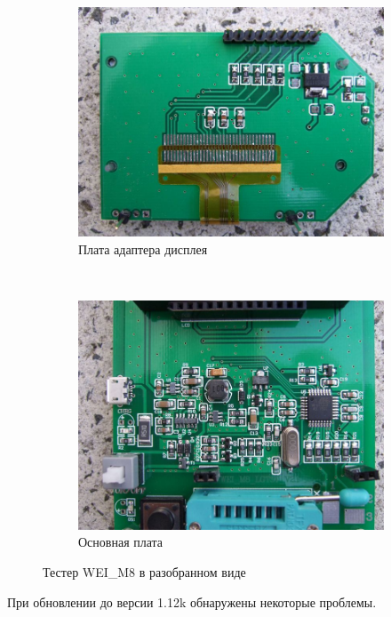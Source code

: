 \begin{figure}[H]
  \begin{subfigure}[b]{.5\textwidth}
    \centering
    \includegraphics[width=1.\textwidth]{../PNG/WEI_M8_D.JPG}
    \caption{Плата адаптера дисплея}
  \end{subfigure}
  ~
  \begin{subfigure}[b]{.5\textwidth}
    \centering
    \includegraphics[width=1.\textwidth]{../PNG/WEI_M8_L.JPG}
    \caption{Основная плата}
  \end{subfigure}
  \caption{Тестер WEI\_M8 в разобранном виде}
  \label{fig:WeiM8int}
\end{figure}
При обновлении до версии 1.12k обнаружены некоторые проблемы.
